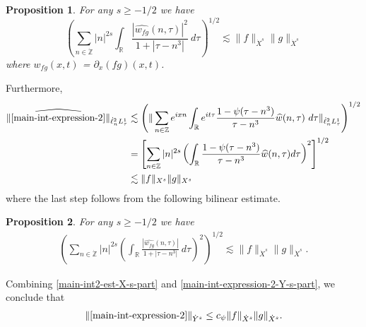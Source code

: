 \documentclass[12pt,reqno]{amsart}
\numberwithin{equation}{section}  %
\numberwithin{figure}{section}
\newcommand{\rr}{\mathbb{R}}
\newcommand{\zz}{\mathbb{Z}}
\newcommand{\zzdot}{\dot{\zz}}
\newcommand{\wh}{\widehat}
\newcommand{\p}{\partial}
\theoremstyle{plain}
\newtheorem{proposition}{Proposition}
\theoremstyle{definition}
\theoremstyle{remark}
\begin{document}
%
%
%
%
%
%
\begin{proposition}
	\label{prop:prim-bilin-est}
	For any $s \ge -1/2$ we have
	\begin{equation}
		\label{prim-bilin-est}
		\left( \sum_{n \in \dot{\zz}} |n|^{2s} \int_\rr
		\frac{|\wh{w_{fg}}(n, \tau) |^2}{1+ |\tau - 
		n^{3}| } 
		 \ d \tau 
		\right)^{1/2}
		\lesssim \|f\|_{\dot{X}^s} \|g\|_{\dot{X}^s}
	\end{equation}
	where $w_{fg}(x,t)$ = $\p_x(fg)(x,t)$.
\end{proposition}
Furthermore,
%
%
%
%
\begin{equation}
	\label{main-int-expression-2-Y-s-part}
	\begin{split}
		\|\wh{\eqref{main-int-expression-2}} \|_{\dot{\ell}^2_n L^1_\tau}
		& \lesssim \left( \| \sum_{n \in \zz} e^{ixn} \int_\rr 
		e^{it \tau} \frac{ 1 - \psi (\tau - n^{3} ) 
		}{\tau - n^{3}} \wh{w}(n, \tau) \ 
		d \tau\|_{\dot{\ell}^2_n L^1_\tau} \right)^{1/2}
		\\
		& = \left[ \sum_{n \in \zz}|n|^{2s} \left(
		\int_{\rr}\frac{1 - \psi(\tau - n^{3})}{\tau - n^{3}} \wh{w}(n, \tau) d
		\tau \right)^{2} \right]^{1/2}
		\\
		& \lesssim \|f\|_{X^s} \|g\|_{X^s}
	\end{split}
\end{equation}
%
%
where the last step follows from the following bilinear estimate.
%
%
%
%
%
%
%
\begin{proposition}
\label{prop:bilinear-estimate2}
For any $s \ge -1/2$ we have
%
%
\begin{equation}
	\label{bilinear-estimate2}
	\begin{split}
		\left( \sum_{n \in \zzdot} |n|^{2s}  \left ( \int_\rr 
		\frac{|\wh{w_{fg}}(n, \tau) |}{1 + | \tau - n^3 |}
		 \ d\tau \right)^2  \right)^{1/2} \lesssim \|f\|_{\dot{X}^s} \|g\|_{\dot{X}^s}.
	\end{split}
\end{equation}
\end{proposition}
%
%
Combining \eqref{main-int2-est-X-s-part} and
\eqref{main-int-expression-2-Y-s-part}, we conclude that
%
%
%
%
\begin{equation}
	\label{main-int2-est}
	\begin{split}
		\|\eqref{main-int-expression-2}\|_{\dot{Y}^s} \le c_{\psi}\|f\|_{\dot{X}^s} \|g\|_{\dot{X}^s}.
	\end{split}
\end{equation}
%
%
\end{document}
